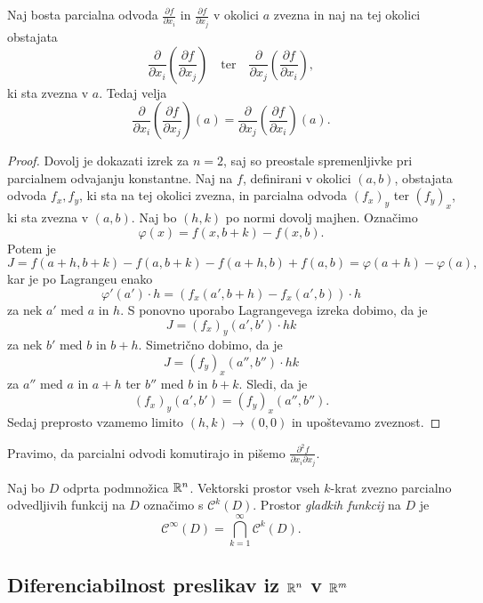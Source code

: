 
\begin{izrek}
Naj bosta parcialna odvoda $\frac{\partial f}{\partial x_i}$ in
$\frac{\partial f}{\partial x_j}$ v okolici $a$ zvezna in naj na
tej okolici obstajata
\[
\frac{\partial}{\partial x_i}\left(
	\frac{\partial f}{\partial x_j}
\right)
\quad \text{ter} \quad
\frac{\partial}{\partial x_j}\left(
	\frac{\partial f}{\partial x_i}
\right),
\]
ki sta zvezna v $a$. Tedaj velja
\[
\frac{\partial}{\partial x_i}\left(
	\frac{\partial f}{\partial x_j}
\right)(a) =
\frac{\partial}{\partial x_j}\left(
	\frac{\partial f}{\partial x_i}
\right)(a).
\]
\end{izrek}

\begin{proof}
Dovolj je dokazati izrek za $n=2$, saj so preostale spremenljivke
pri parcialnem odvajanju konstantne. Naj na $f$, definirani v
okolici $(a,b)$, obstajata odvoda $f_x,f_y$, ki sta na tej okolici
zvezna, in parcialna odvoda $(f_x)_y$ ter $(f_y)_x$, ki sta zvezna
v $(a,b)$. Naj bo $(h,k)$ po normi dovolj majhen. Označimo
\[
\varphi(x) = f(x, b+k) - f(x, b).
\]
Potem je
\[
J =
f(a+h, b+k) - f(a, b+k) - f(a+h, b) + f(a, b) =
\varphi(a+h) - \varphi(a),
\]
kar je po Lagrangeu enako
\[
\varphi'(a') \cdot h = \left(
	f_x(a', b+h) - f_x(a', b)
\right) \cdot h
\]
za nek $a'$ med $a$ in $h$. S ponovno uporabo Lagrangevega izreka
dobimo, da je
\[
J = (f_x)_y(a', b')\cdot hk
\]
za nek $b'$ med $b$ in $b+h$. Simetrično dobimo, da je
\[
J = (f_y)_x(a'', b'')\cdot hk
\]
za $a''$ med $a$ in $a+h$ ter $b''$ med $b$ in $b+k$. Sledi, da je
\[
(f_x)_y(a', b') = (f_y)_x(a'', b'').
\]
Sedaj preprosto vzamemo limito $(h, k) \to (0, 0)$ in upoštevamo
zveznost.
\end{proof}

\begin{opomba}
Pravimo, da parcialni odvodi komutirajo in pišemo
$\frac{\partial^2 f}{\partial x_i\partial x_j}$.
\end{opomba}

\begin{definicija}
Naj bo $D$ odprta podmnožica $\mathbb{R}^n$. Vektorski prostor vseh
$k$-krat zvezno parcialno odvedljivih funkcij na $D$ označimo s
$\mathcal{C}^k(D)$. Prostor
\emph{gladkih funkcij} na $D$ je
\[
\mathcal{C}^\infty(D) = \bigcap_{k=1}^\infty \mathcal{C}^k(D).
\]
\end{definicija}

\newpage

\subsection{Diferenciabilnost preslikav iz $\mathbb{R}^n$ v $\mathbb{R}^m$}

